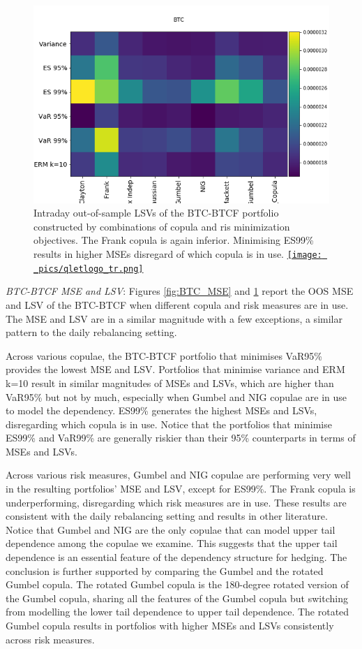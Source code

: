 \documentclass[11pt,a4paper,english]{article}
\begin{document}
\begin{figure}[t]
\includegraphics[width=\textwidth]{_pics/revision_BTC_LSVs.png}
  \caption{Intraday out-of-sample LSVs of the BTC-BTCF portfolio constructed by combinations of copula and ris minimization objectives.
    The Frank copula is again inferior. Minimising ES99\% results in higher MSEs disregard of which copula is in use.
  \href{http://www.quantlet.com/}{\texttt{[image: \_pics/qletlogo\_tr.png]}} }
\label{fig:BTC_LSV}
\end{figure}

\textit{BTC-BTCF MSE and LSV}: Figures \ref{fig:BTC_MSE} and \ref{fig:BTC_LSV}  report the OOS MSE and LSV of the BTC-BTCF when different copula and risk measures are in use.
The MSE and LSV are in a similar magnitude with a few exceptions, a similar pattern to the daily rebalancing setting.

Across various copulae, the BTC-BTCF portfolio that minimises VaR95\% provides the lowest MSE and LSV.
Portfolios that minimise variance and ERM k=10 result in similar magnitudes of MSEs and LSVs, which are higher than VaR95\% but not by much,
especially when Gumbel and NIG copulae are in use to model the dependency. ES99\% generates the highest MSEs and LSVs,
disregarding which copula is in use. Notice that the portfolios that minimise ES99\% and VaR99\% are generally riskier than their 95\% counterparts in terms of MSEs and LSVs.

Across various risk measures, Gumbel and NIG copulae are performing very well in the resulting portfolios’ MSE and LSV, except for ES99\%.
The Frank copula is underperforming, disregarding which risk measures are in use.
These results are consistent with the daily rebalancing setting and results in other literature.
Notice that Gumbel and NIG are the only copulae that can model upper tail dependence among the copulae we examine.
This suggests that the upper tail dependence is an essential feature of the dependency structure for hedging.
The conclusion is further supported by comparing the Gumbel and the rotated Gumbel copula.
The rotated Gumbel copula is the 180-degree rotated version of the Gumbel copula, sharing all the features of the Gumbel copula but switching from modelling the lower tail dependence to upper tail dependence.
The rotated Gumbel copula results in portfolios with higher MSEs and LSVs consistently across risk measures.
\end{document}
